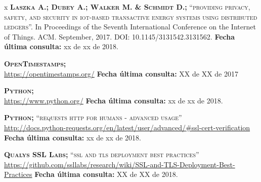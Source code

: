 \begin{thebibliography} {x}
	 \textsc{\textbf{Laszka A.; Dubey A.; Walker M. \& Schmidt D.; }} \textsc{“providing privacy, safety, and security in iot-based transactive energy systems using distributed ledgers”.} In Proceedings of the Seventh International Conference on the Internet of Things. ACM. September, 2017. DOI: 10.1145/3131542.3131562.	
	\newline \textbf{Fecha última consulta:} xx de xx de 2018.
		
		
	

	 \textsc{\textbf{OpenTimestamps; }} \\ 
	\url{https://opentimestamps.org/} 
	\newline \textbf{Fecha última consulta:} XX de XX de 2017		
		
	 \textsc{\textbf{Python; }} \\ 
	\url{https://www.python.org/}
	\newline \textbf{Fecha última consulta:} xx de xx de 2018.
		
	 \textsc{\textbf{Python; }}\textsc{“requests http for humans - advanced usage”} \\ 
	\url{http://docs.python-requests.org/en/latest/user/advanced/#ssl-cert-verification}
	\newline \textbf{Fecha última consulta:} xx de xx de 2018.
	
	 \textsc{\textbf{Qualys SSL Labs; }}\textsc{“ssl and tls deployment best practices”} \\
	\url{https://github.com/ssllabs/research/wiki/SSL-and-TLS-Deployment-Best-Practices}
	\newline \textbf{Fecha última consulta:} XX de XX de 2018.
		

\end{thebibliography}
